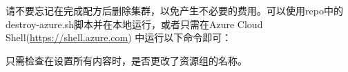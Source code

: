 请不要忘记在完成配方后删除集群，以免产生不必要的费用。可以使用repo中的destroy-azure.sh脚本并在本地运行，或者只需在Azure Cloud Shell(\url{https://shell.azure.com}) 中运行以下命令即可：


只需检查在设置所有内容时，是否更改了资源组的名称。
